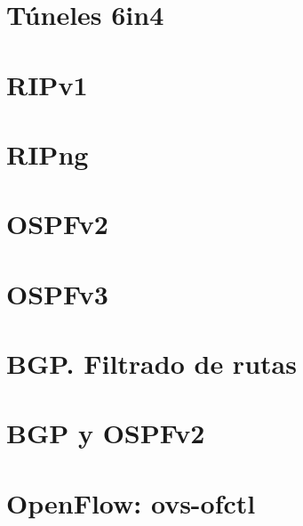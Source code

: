 \documentclass{article}
\begin{document}
\tableofcontents

\section{Túneles 6in4}
  

\section{RIPv1}
  

\newpage

\section{RIPng}
  

\newpage

\section{OSPFv2}
  

\newpage

\section{OSPFv3}
  

\newpage

\section{BGP. Filtrado de rutas}
  

\section{BGP y OSPFv2}
  

\newpage

\section{OpenFlow: ovs-ofctl}
  
\end{document}
